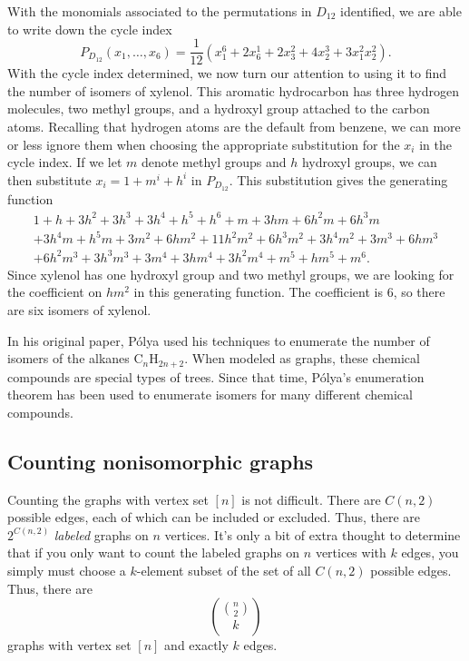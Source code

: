 With the monomials associated to the permutations in $D_{12}$ identified,
we are able to write down the cycle index
\[P_{D_{12}}(x_1,\dots,x_6) = \frac{1}{12}(x_1^6 + 2x_6^1 + 2x_3^2+4x_2^3 + 3x_1^2x_2^2).\]
With the cycle index determined, we now turn our attention to using it
to find the number of isomers of xylenol. This aromatic hydrocarbon
has three hydrogen molecules, two methyl groups, and a hydroxyl group
attached to the carbon atoms. Recalling that hydrogen atoms are the
default from benzene, we can more or less ignore them when choosing
the appropriate substitution for the $x_i$ in the cycle index. If we
let $m$ denote methyl groups and $h$ hydroxyl groups, we can then
substitute $x_i = 1+m^i+h^i$ in $P_{D_{12}}$. This substitution gives the
generating function
\begin{multline*}1+h+3 h^2+3 h^3+3 h^4+h^5+h^6+m+3 h m+6 h^2 m+6 h^3
  m\\+3 h^4 m+h^5 m+3 m^2+6 h m^2+11 h^2 m^2+6 h^3 m^2+3 h^4 m^2+3
  m^3+6 h m^3\\+6 h^2 m^3+3 h^3 m^3+3 m^4+3 h m^4+3 h^2 m^4+m^5+h
  m^5+m^6.\end{multline*}
Since xylenol has one hydroxyl group and two methyl groups, we are
looking for the coefficient on $hm^2$ in this generating function. The
coefficient is $6$, so there are six isomers of xylenol.

In his original paper, P\'olya used his techniques to enumerate the
number of isomers of the alkanes $\text{C}_n\text{H}_{2n+2}$. When
modeled as graphs, these chemical compounds are special types of
trees. Since that time, P\'olya's enumeration theorem has been used to
enumerate isomers for many different chemical compounds.

\subsection{Counting nonisomorphic graphs}\label{ss:polya:graphs}

Counting the graphs with vertex set $[n]$ is not difficult. There are
$C(n,2)$ possible edges, each of which can be included or
excluded. Thus, there are $2^{C(n,2)}$ \emph{labeled} graphs on $n$
vertices. It's only a bit of extra thought to determine that if you
only want to count the labeled graphs on $n$ vertices with $k$ edges,
you simply must choose a $k$-element subset of the set of all $C(n,2)$
possible edges. Thus, there are
\[\binom{\binom{n}{2}}{k}\]
graphs with vertex set $[n]$ and exactly $k$ edges.

